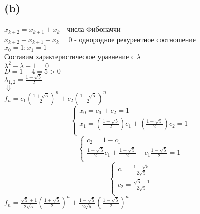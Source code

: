 \documentclass[12pt]{article}
\begin{document}
	\subsection*{(b)}
	$x_{k+2} = x_{k+1} + x_{k}$ - числа Фибоначчи \\
	$x_{k+2} - x_{k+1} - x_{k} = 0$ - однородное рекурентное соотношение\\
	$x_{0} = 1; x_{1} = 1$ \\
	Составим характеристическое уравнение с $\lambda$ \\
	${\lambda}^2 - {\lambda} - 1 = 0$ \\
	$D = 1 + 4 = 5 > 0$ \\
	$\lambda_{1,2} = \frac{1 \pm \sqrt{5}}{2}$ \\
	$\Downarrow$ \\
	$f_{n} = c_{1}{(\frac{1 + \sqrt{5}}{2})}^n + c_{2}{(\frac{1 - \sqrt{5}}{2})}^n$ \\
	$$  
	\left\{  
	\begin{array}{lcl}  
	x_{0} = c_{1} + c_{2} = 1\\
	x_{1} = {(\frac{1 + \sqrt{5}}{2})}c_{1} + (\frac{1 - \sqrt{5}}{2})c_{2} = 1\\
	\end{array}   
	\right.  
	$$ 
	$$  
	\left\{  
	\begin{array}{lcl}  
	c_{2} = 1 - c_{1}\\
	\frac{1 + \sqrt{5}}{2}c_{1} + \frac{1 - \sqrt{5}}{2} - c_{1}\frac{1 - \sqrt{5}}{2} = 1\\
	\end{array}   
	\right.  
	$$ 
	$$  
	\left\{  
	\begin{array}{lcl}  
	c_{1} = \frac{1 + \sqrt{5}}{2\sqrt{5}}\\
	c_{2} = \frac{\sqrt{5} - 1}{2\sqrt{5}}\\
	\end{array}   
	\right.  
	$$	
	$f_{n} = \frac{\sqrt{5} + 1}{2\sqrt{5}}{(\frac{1 + \sqrt{5}}{2})}^n + \frac{1 - \sqrt{5}}{2\sqrt{5}}{(\frac{1 - \sqrt{5}}{2})}^n$ \\
	 \\
\end{document}
